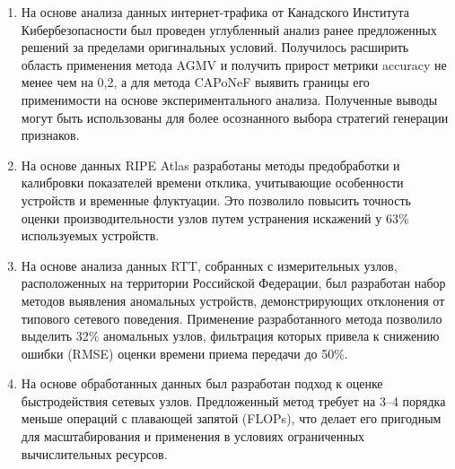 \begin{enumerate}
  \item На основе анализа данных интернет-трафика от Канадского Института Кибербезопасности был проведен углубленный анализ ранее предложенных решений за пределами оригинальных условий. Получилось расширить область применения метода AGMV и получить прирост метрики accuracy не менее чем на 0,2, а для метода CAPoNeF выявить границы его применимости на основе экспериментального анализа. Полученные выводы могут быть использованы для более осознанного выбора стратегий генерации признаков.
  
  \item На основе данных RIPE Atlas разработаны методы предобработки и калибровки показателей времени отклика, учитывающие особенности устройств и временные флуктуации. Это позволило повысить точность оценки производительности узлов путем устранения искажений у 63\% используемых устройств.
  
  \item На основе анализа данных RTT, собранных с измерительных узлов, расположенных на территории Российской Федерации, был разработан набор методов выявления аномальных устройств, демонстрирующих отклонения от типового сетевого поведения. Применение разработанного метода позволило выделить 32\% аномальных узлов, фильтрация которых привела к снижению ошибки (RMSE) оценки времени приема передачи до 50\%.
  
  \item На основе обработанных данных был разработан подход к оценке быстродействия сетевых узлов. Предложенный метод требует на 3–4 порядка меньше операций с плавающей запятой (FLOPs), что делает его пригодным для масштабирования и применения в условиях ограниченных вычислительных ресурсов.
\end{enumerate}
